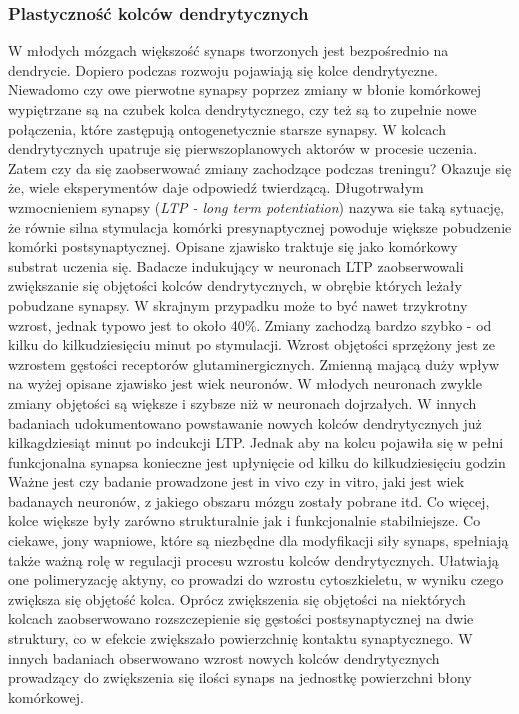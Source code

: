 \documentclass{article}
\begin{document}
\subsubsection{Plastyczność kolców dendrytycznych}
W młodych mózgach większość synaps tworzonych jest bezpośrednio na dendrycie.
Dopiero podczas rozwoju pojawiają się kolce dendrytyczne.
Niewadomo czy owe pierwotne synapsy poprzez zmiany w błonie komórkowej wypiętrzane są na czubek kolca dendrytycznego, czy też są to zupełnie nowe połączenia, które zastępują ontogenetycznie starsze synapsy.
W kolcach dendrytycznych upatruje się pierwszoplanowych aktorów w procesie uczenia.
Zatem czy da się zaobserwować zmiany zachodzące podczas treningu?
Okazuje się że, wiele eksperymentów daje odpowiedź twierdzącą.
Długotrwałym wzmocnieniem synapsy (\emph{LTP - long term potentiation}) nazywa sie taką sytuację, że równie silna stymulacja komórki presynaptycznej powoduje większe pobudzenie komórki postsynaptycznej.
Opisane zjawisko traktuje się jako komórkowy substrat uczenia się.
Badacze indukujący w neuronach LTP zaobserwowali zwiększanie się objętości kolców dendrytycznych, w obrębie których leżały pobudzane synapsy.
W skrajnym przypadku może to być nawet trzykrotny wzrost, jednak typowo jest to około 40\%.
Zmiany zachodzą bardzo szybko - od kilku do kilkudziesięciu minut po stymulacji. 
Wzrost objętości sprzężony jest ze wzrostem gęstości receptorów glutaminergicznych.
Zmienną mającą duży wpływ na wyżej opisane zjawisko jest wiek neuronów.
W młodych neuronach zwykle zmiany objętości są większe i szybsze niż w neuronach dojrzałych.
W innych badaniach udokumentowano powstawanie nowych kolców dendrytycznych już kilkagdziesiąt minut po indcukcji LTP.
Jednak aby na kolcu pojawiła się w pełni funkcjonalna synapsa konieczne jest upłynięcie od kilku do kilkudziesięciu godzin\cite{Sala2014}
Ważne jest czy badanie prowadzone jest in vivo czy in vitro, jaki jest wiek badanaych neuronów, z jakiego obszaru mózgu zostały pobrane itd.
Co więcej, kolce większe były zarówno strukturalnie jak i funkcjonalnie stabilniejsze.
Co ciekawe, jony wapniowe, które są niezbędne dla modyfikacji siły synaps, spełniają także ważną rolę w regulacji procesu wzrostu kolców dendrytycznych.
Ułatwiają one polimeryzację aktyny, co prowadzi do wzrostu cytoszkieletu, w wyniku czego zwiększa się objętość kolca\cite{Costa2007}.
Oprócz zwiększenia się objętości na niektórych kolcach zaobserwowano rozszczepienie się gęstości postsynaptycznej na dwie struktury, co w efekcie zwiększało powierzchnię kontaktu synaptycznego.
W innych badaniach obserwowano wzrost nowych kolców dendrytycznych prowadzący do zwiększenia się ilości synaps na jednostkę powierzchni błony komórkowej.
\end{document}
